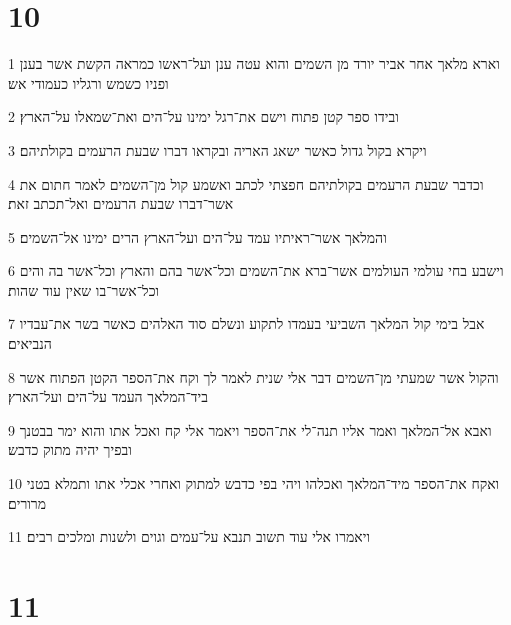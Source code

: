 \chapter{10}

\par 1 וארא מלאך אחר אביר יורד מן השמים והוא עטה ענן ועל־ראשו כמראה הקשת אשר בענן ופניו כשמש ורגליו כעמודי אש׃
\par 2 ובידו ספר קטן פתוח וישם את־רגל ימינו על־הים ואת־שמאלו על־הארץ׃
\par 3 ויקרא בקול גדול כאשר ישאג האריה ובקראו דברו שבעת הרעמים בקולתיהם׃
\par 4 וכדבר שבעת הרעמים בקולתיהם חפצתי לכתב ואשמע קול מן־השמים לאמר חתום את אשר־דברו שבעת הרעמים ואל־תכתב זאת׃
\par 5 והמלאך אשר־ראיתיו עמד על־הים ועל־הארץ הרים ימינו אל־השמים׃
\par 6 וישבע בחי עולמי העולמים אשר־ברא את־השמים וכל־אשר בהם והארץ וכל־אשר בה והים וכל־אשר־בו שאין עוד שהות׃
\par 7 אבל בימי קול המלאך השביעי בעמדו לתקוע ונשלם סוד האלהים כאשר בשר את־עבדיו הנביאים׃
\par 8 והקול אשר שמעתי מן־השמים דבר אלי שנית לאמר לך וקח את־הספר הקטן הפתוח אשר ביד־המלאך העמד על־הים ועל־הארץ׃
\par 9 ואבא אל־המלאך ואמר אליו תנה־לי את־הספר ויאמר אלי קח ואכל אתו והוא ימר בבטנך ובפיך יהיה מתוק כדבש׃
\par 10 ואקח את־הספר מיד־המלאך ואכלהו ויהי בפי כדבש למתוק ואחרי אכלי אתו ותמלא בטני מרורים׃
\par 11 ויאמרו אלי עוד תשוב תנבא על־עמים וגוים ולשנות ומלכים רבים׃

\chapter{11}

